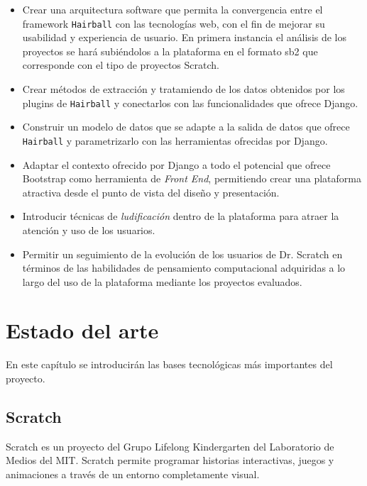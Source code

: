 \documentclass[a4paper, 12pt]{book}
\begin{document}
\begin{itemize}
  \item Crear una arquitectura software que permita la convergencia entre el framework 
	\texttt{Hairball} con las tecnologías web, con el fin de mejorar su usabilidad y 
	experiencia de usuario. En 	primera instancia el análisis de los proyectos se hará 
	subiéndolos a la plataforma en el formato sb2 que corresponde con el tipo de
	proyectos Scratch.
	\item Crear métodos de extracción y tratamiendo de los datos obtenidos por los
	plugins de \texttt{Hairball} y conectarlos con las funcionalidades que ofrece
	Django.
  \item Construir un modelo de datos que se adapte a la salida de datos que ofrece 
	\texttt{Hairball} y parametrizarlo con las herramientas ofrecidas por Django.
  \item Adaptar el contexto ofrecido por Django a todo el potencial que ofrece Bootstrap 
	como herramienta de \emph{Front End}, permitiendo crear una plataforma atractiva 
	desde el punto de vista del diseño y presentación.
  \item Introducir técnicas de \emph{ludificación} dentro de la plataforma para atraer 
	la atención y uso de los usuarios.
	\item Permitir un seguimiento de la evolución de los usuarios de Dr. Scratch en 
	términos de las habilidades de pensamiento computacional adquiridas a lo largo del 
	uso de la plataforma mediante los proyectos evaluados.
\end{itemize}



\cleardoublepage
\chapter{Estado del arte}

En este capítulo se introducirán las bases tecnológicas más importantes del proyecto.


\section{Scratch}
\label{sec:seccion2}
Scratch es un proyecto del Grupo Lifelong Kindergarten del Laboratorio de Medios del MIT.
Scratch permite programar historias interactivas, juegos y animaciones a través de un
entorno completamente visual. \\
\end{document}
